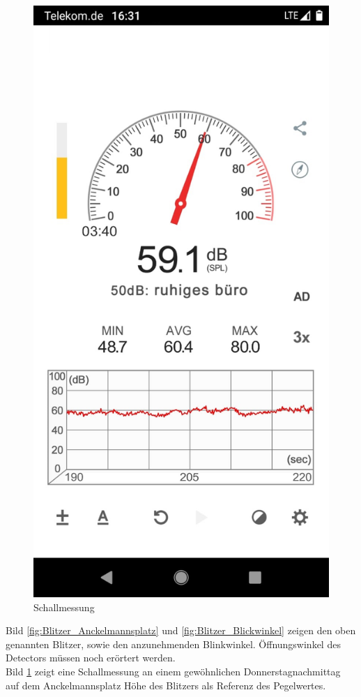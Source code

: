 \begin{figure}[h]
\centering
\includegraphics[scale=0.15]{Sections/Brainstorming/Pegelmessung_Anckelmannsplatz_am_Blitzer_Nachmittag.jpeg}
\caption{Schallmessung}
\label{fig:Schallmessung}
\end{figure}

Bild \ref{fig:Blitzer_Anckelmannsplatz} und \ref{fig:Blitzer_Blickwinkel} zeigen den oben genannten Blitzer, sowie den anzunehmenden Blinkwinkel. Öffnungswinkel des Detectors müssen noch erörtert werden. \\
\noindent Bild \ref{fig:Schallmessung} zeigt eine Schallmessung an einem gewöhnlichen Donnerstagnachmittag auf dem Anckelmannsplatz Höhe des Blitzers als Referenz des Pegelwertes.

\newpage

%

\newpage